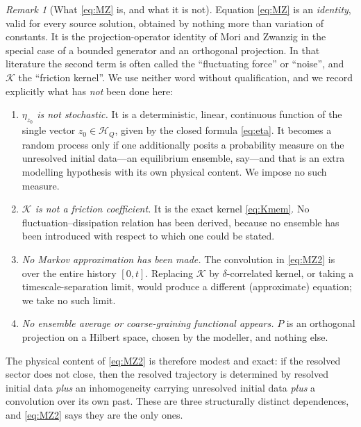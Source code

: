 \documentclass[11pt,reqno]{amsart}
\numberwithin{equation}{section}
\theoremstyle{plain}
\theoremstyle{definition}
\theoremstyle{remark}
\newtheorem{remark}[theorem]{Remark}
\newcommand{\HQ}{\mathcal{H}_{Q}}
\newcommand{\Kmem}{\mathcal{K}}
\begin{document}
\begin{remark}[What \eqref{eq:MZ} is, and what it is not]
\label{rem:MZ}
Equation \eqref{eq:MZ} is an \emph{identity}, valid for every source solution, obtained by
nothing more than variation of constants. It is the projection-operator identity of Mori and
Zwanzig \cite{Zwanzig1960,Mori1965,Zwanzig2001} in the special case of a bounded generator
and an orthogonal projection. In that literature the second term is often called the
``fluctuating force'' or ``noise'', and $\Kmem$ the ``friction kernel''. We use neither
word without qualification, and we record explicitly what has \emph{not} been done here:
\begin{enumerate}
\item \emph{$\eta_{z_{0}}$ is not stochastic.} It is a deterministic, linear, continuous
function of the single vector $z_{0}\in\HQ$, given by the closed formula \eqref{eq:eta}. It
becomes a random process only if one additionally posits a probability measure on the
unresolved initial data---an equilibrium ensemble, say---and that is an extra modelling
hypothesis with its own physical content. We impose no such measure.
\item \emph{$\Kmem$ is not a friction coefficient.} It is the exact kernel
\eqref{eq:Kmem}. No fluctuation--dissipation relation has been derived, because no ensemble
has been introduced with respect to which one could be stated.
\item \emph{No Markov approximation has been made.} The convolution in \eqref{eq:MZ2} is
over the entire history $[0,t]$. Replacing $\Kmem$ by $\delta$-correlated kernel, or taking
a timescale-separation limit, would produce a different (approximate) equation; we take no
such limit.
\item \emph{No ensemble average or coarse-graining functional appears.} $P$ is an orthogonal
projection on a Hilbert space, chosen by the modeller, and nothing else.
\end{enumerate}
The physical content of \eqref{eq:MZ2} is therefore modest and exact: if the resolved sector
does not close, then the resolved trajectory is determined by resolved initial data
\emph{plus} an inhomogeneity carrying unresolved initial data \emph{plus} a convolution over
its own past. These are three structurally distinct dependences, and \eqref{eq:MZ2} says
they are the only ones.
\end{remark}
\end{document}
